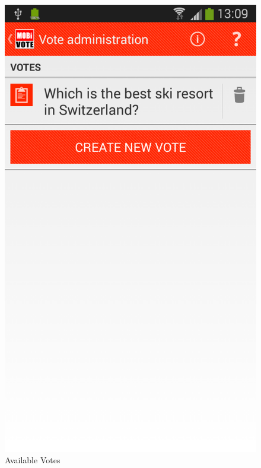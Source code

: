 \documentclass[numbers=noenddot, abstract=on, a4paper, headsepline,
footsepline, oneside, draft=off]{scrreprt}
\begin{document}
\begin{figure}[!htb]
	\begin{minipage}{.5\textwidth}
  		\centering
		\includegraphics[height=.4\textheight]{img/screenshots/votes}
		\caption{Available Votes}
		\label{fig:handbook_votes}
	\end{minipage}
	\begin{minipage}{.5\textwidth}
  		\centering

\end{minipage}
\end{figure}
\end{document}
